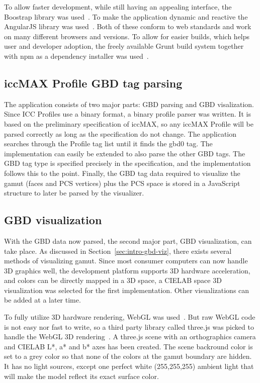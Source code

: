 To allow faster development, while still having an appealing interface, the Boostrap library was used~\cite{Bootstrap}.
To make the application dynamic and reactive the AngularJS library was used~\cite{Angular}.
Both of these conform to web standards and work on many different browsers and versions.
To allow for easier builds, which helps user and developer adoption, the freely available Grunt build system together with npm as a dependency installer was used~\cite{Grunt,Npm}.

\subsection{iccMAX Profile GBD tag parsing}
The application consists of two major parts: GBD parsing and GBD visalization.
Since ICC Profiles use a binary format, a binary profile parser was written.
It is based on the preliminary specification of iccMAX, so any iccMAX Profile will be parsed correctly as long as the specification do not change.
The application searches through the Profile tag list until it finds the gbd0 tag.
The implementation can easily be extended to also parse the other GBD tags.
The GBD tag type is specified precisely in the specification, and the implementation follows this to the point.
Finally, the GBD tag data required to visualize the gamut (faces and PCS vertices) plus the PCS space is stored in a JavaScript structure to later be parsed by the visualizer.

\subsection{GBD visualization}
With the GBD data now parsed, the second major part, GBD visualization, can take place.
As discussed in Section~\ref{sec:intro-gbd-viz}, there exists several methods of visualizing gamut.
Since most consumer computers can now handle 3D graphics well, the development platform supports 3D hardware acceleration, and colors can be directly mapped in a 3D space, a CIELAB space 3D visualization was selected for the first implementation.
Other visualizations can be added at a later time.

To fully utilize 3D hardware rendering, WebGL was used~\cite{WebGl}.
But raw WebGL code is not easy nor fast to write, so a third party library called three.js was picked to handle the WebGL 3D rendering~\cite{ThreeJs}.
A three.js scene with an orthographics camera and CIELAB L*, a* and b* axes has been created.
The scene backround color is set to a grey color so that none of the colors at the gamut boundary are hidden.
It has no light sources, except one perfect white (255,255,255) ambient light that will make the model reflect its exact surface color.

